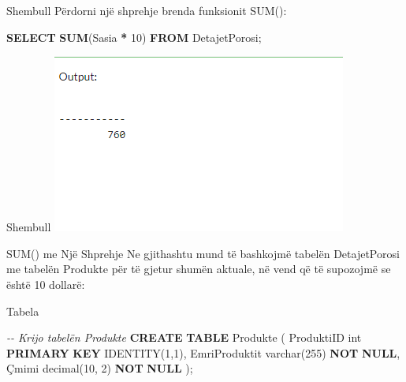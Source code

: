 \documentclass[
  ignorenonframetext,
]{beamer}
\newenvironment{Shaded}{\begin{snugshade}}{\end{snugshade}}
\newcommand{\CommentTok}[1]{\textcolor[rgb]{0.56,0.35,0.01}{\textit{#1}}}
\newcommand{\DataTypeTok}[1]{\textcolor[rgb]{0.13,0.29,0.53}{#1}}
\newcommand{\DecValTok}[1]{\textcolor[rgb]{0.00,0.00,0.81}{#1}}
\newcommand{\FunctionTok}[1]{\textcolor[rgb]{0.13,0.29,0.53}{\textbf{#1}}}
\newcommand{\KeywordTok}[1]{\textcolor[rgb]{0.13,0.29,0.53}{\textbf{#1}}}
\newcommand{\NormalTok}[1]{#1}
\newcommand{\OperatorTok}[1]{\textcolor[rgb]{0.81,0.36,0.00}{\textbf{#1}}}
\begin{document}
\begin{frame}[fragile]{Shembull}
\label{shembull-43}
Përdorni një shprehje brenda funksionit SUM():


\begin{Shaded}
\begin{Highlighting}[]
\KeywordTok{SELECT} \FunctionTok{SUM}\NormalTok{(Sasia }\OperatorTok{*} \DecValTok{10}\NormalTok{)}
\KeywordTok{FROM}\NormalTok{ DetajetPorosi;}
\end{Highlighting}
\end{Shaded}
\end{frame}

\begin{frame}{Shembull}
\label{shembull-44}
\includegraphics{./Figs/query54.png}
\end{frame}

\begin{frame}{SUM() me Një Shprehje}
\label{sum-me-njuxeb-shprehje-1}
Ne gjithashtu mund të bashkojmë tabelën DetajetPorosi me tabelën
Produkte për të gjetur shumën aktuale, në vend që të supozojmë se është
10 dollarë:
\end{frame}

\begin{frame}[fragile]{Tabela}
\label{tabela-6}
\begin{Shaded}
\begin{Highlighting}[]
\CommentTok{{-}{-} Krijo tabelën Produkte}
\KeywordTok{CREATE} \KeywordTok{TABLE}\NormalTok{ Produkte (}
\NormalTok{  ProduktiID }\DataTypeTok{int} \KeywordTok{PRIMARY} \KeywordTok{KEY}\NormalTok{ IDENTITY(}\DecValTok{1}\NormalTok{,}\DecValTok{1}\NormalTok{),}
\NormalTok{  EmriProduktit }\DataTypeTok{varchar}\NormalTok{(}\DecValTok{255}\NormalTok{) }\KeywordTok{NOT} \KeywordTok{NULL}\NormalTok{,}
\NormalTok{  Çmimi }\DataTypeTok{decimal}\NormalTok{(}\DecValTok{10}\NormalTok{, }\DecValTok{2}\NormalTok{) }\KeywordTok{NOT} \KeywordTok{NULL}
\NormalTok{);}
\end{Highlighting}
\end{Shaded}
\end{frame}
\end{document}

